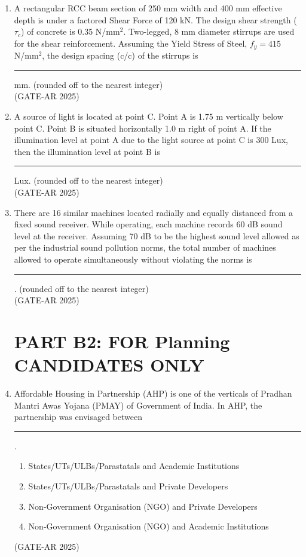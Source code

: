 \documentclass[a4paper,10pt]{article}
\begin{document}
\begin{enumerate}
\item A rectangular RCC beam section of 250 mm width and 400 mm effective depth is under a factored Shear Force of 120 kN. The design shear strength ($\tau_c$) of concrete is 0.35 N/mm$^2$. Two-legged, 8 mm diameter stirrups are used for the shear reinforcement. Assuming the Yield Stress of Steel, $f_y = 415$ N/mm$^2$, the design spacing (c/c) of the stirrups is \rule{2cm}{0.4pt} mm. (rounded off to the nearest integer) \\
\hfill (GATE-AR 2025)

\item A source of light is located at point C. Point A is 1.75 m vertically below point C. Point B is situated horizontally 1.0 m right of point A. If the illumination level at point A due to the light source at point C is 300 Lux, then the illumination level at point B is \rule{2cm}{0.4pt} Lux. (rounded off to the nearest integer) \\
\hfill (GATE-AR 2025)

\item There are 16 similar machines located radially and equally distanced from a fixed sound receiver. While operating, each machine records 60 dB sound level at the receiver. Assuming 70 dB to be the highest sound level allowed as per the industrial sound pollution norms, the total number of machines allowed to operate simultaneously without violating the norms is \rule{2cm}{0.4pt}. (rounded off to the nearest integer) \\
\hfill (GATE-AR 2025)

\section*{PART B2: FOR Planning CANDIDATES ONLY}

    \item Affordable Housing in Partnership (AHP) is one of the verticals of Pradhan Mantri Awas Yojana (PMAY) of Government of India. In AHP, the partnership was envisaged between \rule{2cm}{0.4pt}.
    \begin{enumerate}
        \item States/UTs/ULBs/Parastatals and Academic Institutions
        \item States/UTs/ULBs/Parastatals and Private Developers
        \item Non-Government Organisation (NGO) and Private Developers
        \item Non-Government Organisation (NGO) and Academic Institutions
    \end{enumerate}
    \hfill (GATE-AR 2025)


\end{enumerate}
\end{document}
